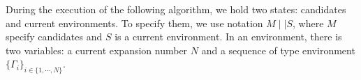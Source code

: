 \documentclass[runningheads]{llncs}
\newcommand \stypeint {\textbf{Int}}
\newcommand \stypebool {\bullet}
\newcommand \typeint[1]{{#1} : \stypeint}
\newcommand \typebool[1]{\stypebool \langle #1 \rangle}
\begin{document}
%
%
%
%
%
%
%
%
%
%
During the execution of the following algorithm,
we hold two states: candidates and current environments.
To specify them, we use notation \( M \mid \mid S \), where
\( M \) specify candidates and \( S \) is a current environment.
%
In an environment, there is two variables:
a current expansion number \( N \)
and a sequence of type environment \( \{\Gamma_i\}_{i \in \{1, \cdots, N\}} \).
\end{document}
